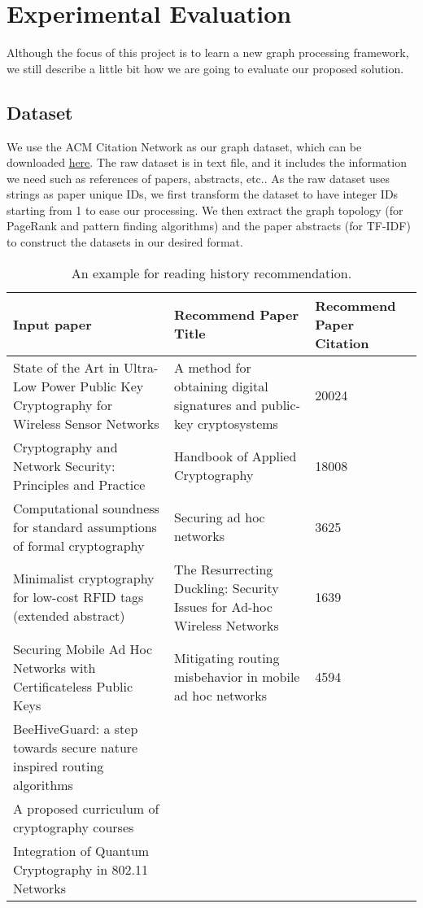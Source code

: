 \section{Experimental Evaluation} \label{sec:exp}
%
Although the focus of this project is to learn a new graph processing framework, we still describe a little bit how we are going to evaluate our proposed solution.
%
\subsection{Dataset} \label{dataset}
%
We use the ACM Citation Network as our graph dataset, which can be downloaded \href{https://aminer.org/citation}{\underline{here}}.
%
The raw dataset is in text file, and it includes the information we need such as references of papers, abstracts, etc..
%
As the raw dataset uses strings as paper unique IDs, we first transform the dataset to have integer IDs starting from 1 to ease our processing.
%
We then extract the graph topology (for PageRank and pattern finding algorithms) and the paper abstracts (for TF-IDF) to construct the datasets in our desired format.
%
\begin{table*}[ht]
	\centering
	\begin{tabular}{p{7cm}p{7cm}p{3cm}}
		\toprule
		\textbf{Input paper}		& \textbf{Recommend Paper Title} 		& \textbf{Recommend Paper Citation} 	\\ \midrule
		State of the Art in Ultra-Low Power Public Key Cryptography for Wireless Sensor Networks &A method for obtaining digital signatures and public-key cryptosystems	&20024\\
		Cryptography and Network Security: Principles and Practice				&Handbook of Applied Cryptography &18008\\
		Computational soundness for standard assumptions of formal cryptography				&Securing ad hoc networks &3625\\
		Minimalist cryptography for low-cost RFID tags (extended abstract)				&The Resurrecting Duckling: Security Issues for Ad-hoc Wireless Networks &1639\\
		Securing Mobile Ad Hoc Networks with Certificateless Public Keys				&Mitigating routing misbehavior in mobile ad hoc networks&4594\\
		BeeHiveGuard: a step towards secure nature inspired routing algorithms\\
		A proposed curriculum of cryptography courses\\
		Integration of Quantum Cryptography in 802.11 Networks\\
		\bottomrule
	\end{tabular}
	\vspace{3mm}
	\caption{An example for reading history recommendation. }
	\label{res:patternexp}
\end{table*}
%
